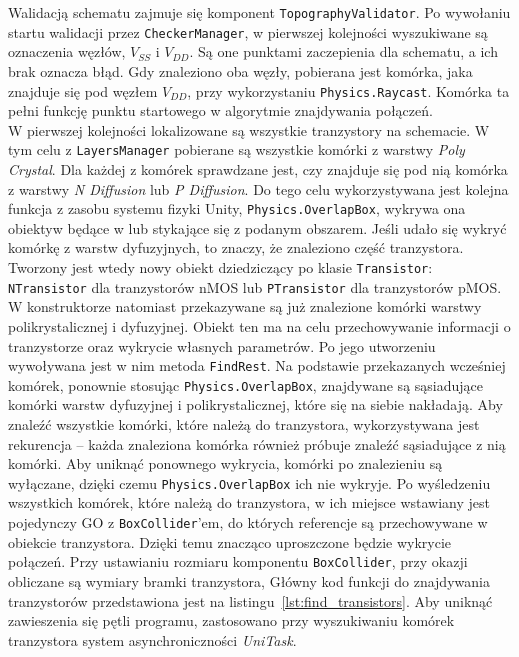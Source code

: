 Walidacją schematu zajmuje się komponent \texttt{TopographyValidator}.
Po wywołaniu startu walidacji przez \texttt{CheckerManager},
w pierwszej kolejności wyszukiwane są oznaczenia węzłów, $V_{SS}$ i $V_{DD}$.
Są one punktami zaczepienia dla schematu, a ich brak oznacza błąd.
Gdy znaleziono oba węzły, pobierana jest komórka, jaka znajduje się pod węzłem $V_{DD}$,
przy wykorzystaniu \texttt{Physics.Raycast}.
Komórka ta pełni funkcję punktu startowego w algorytmie znajdywania połączeń.\\
\indent W pierwszej kolejności lokalizowane są wszystkie tranzystory na schemacie.
W tym celu z \texttt{LayersManager} pobierane są wszystkie komórki z warstwy \textit{Poly Crystal}.
Dla każdej z komórek sprawdzane jest, 
czy znajduje się pod nią komórka z warstwy \textit{N Diffusion} lub \textit{P Diffusion}.
Do tego celu wykorzystywana jest kolejna funkcja z zasobu systemu fizyki Unity, \texttt{Physics.OverlapBox},
wykrywa ona obiektyw będące w lub stykające się z podanym obszarem.
Jeśli udało się wykryć komórkę z warstw dyfuzyjnych, to znaczy, że znaleziono część tranzystora.
Tworzony jest wtedy nowy obiekt dziedziczący po klasie \texttt{Transistor}:
\texttt{NTransistor} dla tranzystorów nMOS lub \texttt{PTransistor} dla tranzystorów pMOS.
W konstruktorze natomiast przekazywane są już znalezione komórki warstwy polikrystalicznej i dyfuzyjnej.
Obiekt ten ma na celu przechowywanie informacji o tranzystorze oraz wykrycie własnych parametrów.
Po jego utworzeniu wywoływana jest w nim metoda \texttt{FindRest}.
Na podstawie przekazanych wcześniej komórek, ponownie stosując \texttt{Physics.OverlapBox},
znajdywane są sąsiadujące komórki warstw dyfuzyjnej i polikrystalicznej, które się na siebie nakładają.
Aby znaleźć wszystkie komórki, które należą do tranzystora, wykorzystywana jest rekurencja
-- każda znaleziona komórka również próbuje znaleźć sąsiadujące z nią komórki.
Aby uniknąć ponownego wykrycia, komórki po znalezieniu są wyłączane,
dzięki czemu \texttt{Physics.OverlapBox} ich nie wykryje.
Po wyśledzeniu wszystkich komórek, które należą do tranzystora,
w ich miejsce wstawiany jest pojedynczy GO z \texttt{BoxCollider}'em,
do których referencje są przechowywane w obiekcie tranzystora.
Dzięki temu znacząco uproszczone będzie wykrycie połączeń.
Przy ustawianiu rozmiaru komponentu \texttt{BoxCollider}, przy okazji obliczane są wymiary bramki tranzystora,
Główny kod funkcji do znajdywania tranzystorów przedstawiona jest na listingu~\ref{lst:find_transistors}.
Aby uniknąć zawieszenia się pętli programu,
zastosowano przy wyszukiwaniu komórek tranzystora system asynchroniczności \textit{UniTask}.
\newpage

